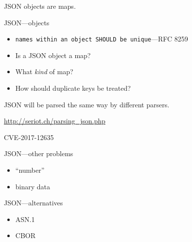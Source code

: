 \documentclass[ignorenonframetext,aspectratio=43]{beamer}
\providecommand{\tightlist}{%
  \setlength{\itemsep}{0pt}\setlength{\parskip}{0pt}}
\begin{document}
\begin{frame}[plain]
\huge
JSON objects are maps.
\end{frame}

\begin{frame}{JSON---objects}
\begin{itemize}
\tightlist
\item \texttt{names within an object SHOULD be unique}---RFC 8259
\item Is a JSON object a map?
\item What {\em kind} of map?
\item How should duplicate keys be treated?
\end{itemize}
\end{frame}

\begin{frame}[plain]
\huge
JSON will be parsed the same way by different parsers.
\end{frame}

\begin{frame}[plain]
\begin{center}
\end{center}
\tiny \url{http://seriot.ch/parsing_json.php}
\end{frame}

\begin{frame}
\centering
\LARGE
CVE-2017-12635
\end{frame}

\begin{frame}{JSON---other problems}
\begin{itemize}
\tightlist
\item ``number''
\item binary data
\end{itemize}
\end{frame}

\begin{frame}{JSON---alternatives}
\begin{itemize}
\tightlist
\item ASN.1
\item CBOR
\end{itemize}
\end{frame}
\end{document}
